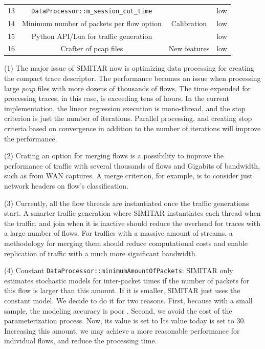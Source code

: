 \begin{table}[ht!]
\begin{tabular}{cccc}
		13                     & \texttt{DataProcessor::m\_session\_cut\_time}           &                                                 & low                     \\
		14                     & Minimum number of packets per flow option                 & \multirow{-4}{*}{Calibration}  & low                     \\ \hline
		15 & Python API/Lua for traffic generation & & low \\
		16 & Crafter of  pcap files & \multirow{-2}{*}{New features} & low \\
		\hline
	\end{tabular}
\end{table}



(1) The major issue of SIMITAR now is optimizing data processing for creating the compact trace descriptor. The performance becomes an issue when processing large \textit{pcap} files with more dozens of thousands of flows. The time expended for processing traces, in this case, is exceeding tens of hours. In the current implementation, the linear regression execution is mono-thread, and the stop criterion is just the number of iterations. Parallel processing, and creating stop criteria based on convergence in addition to the number of iterations will improve the performance. 

(2) Crating an option for merging flows is a possibility to improve the performance of traffic with several thousands of flows and Gigabits of bandwidth, such as from WAN captures. A merge criterion, for example, is to consider just network headers on flow's classification.


(3) Currently, all the flow threads are instantiated once the traffic generations start. A smarter traffic generation where SIMITAR instantiates each thread when the traffic, and join when it is inactive should reduce the overhead for traces with a large number of flows. For traffics with a massive amount of streams, a methodology for merging them should reduce computational costs and enable replication of traffic with a much more significant bandwidth. 


(4) Constant \texttt{DataProcessor::minimumAmountOfPackets}: SIMITAR only estimates stochastic models for inter-packet times if the number of packets for this flow is larger than this amount. If it is smaller, SIMITAR just uses the constant model. We decide to do it for two reasons. First, because with a small sample, the modeling accuracy is poor . Second, we avoid the cost of the parameterization process. Now, its value is set to Its value today is set to 30. Increasing this amount, we may achieve a more reasonable performance for individual flows, and reduce the processing time. 


